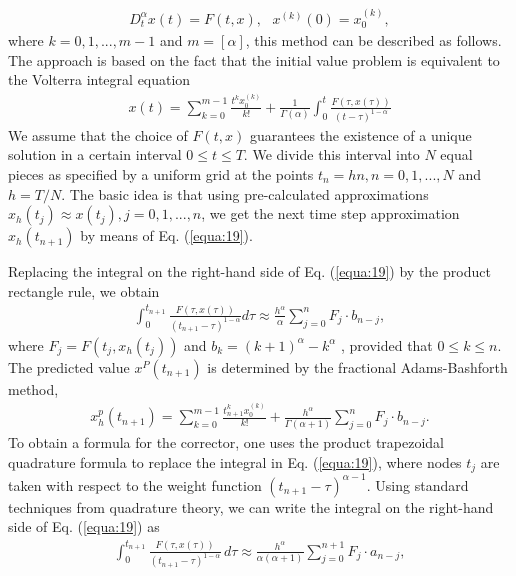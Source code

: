 \documentclass[10pt]{article}
\begin{document}
\begin{multicols}{2}
\begin{align}
            D_t^\alpha x(t) = F(t,x), ~~~ x^{(k)}(0) = x_0^{(k)}, \label{equa:18}
        \end{align}
        where $k = 0, 1, . . . , m - 1$ and $m = [\alpha]$, this method can be described as follows. The approach is based on the fact that the initial value problem is equivalent to the Volterra integral equation
        \begin{align}
            x(t) = \sum_{k=0}^{m-1} \frac{t^k x_0^{(k)}}{k!} + \frac{1}{\Gamma (\alpha)} \int_0^t \frac{F(\tau , x(\tau))}{(t- \tau)^{1-\alpha}} \label{equa:19}
        \end{align}
        We assume that the choice of $F(t, x)$ guarantees the existence of a unique solution in a certain interval $0 \le t \le T$. We divide this interval into $N$ equal pieces as specified by a uniform grid at the points $t_n = hn, n = 0, 1, . . . , N$ and $h = T / N$. The basic idea is that using pre-calculated approximations $x_h(t_j ) \approx x(t_j ), j = 0, 1, . . . , n$, we get the next time step approximation $x_h(t_{n+1})$ by means of Eq. (\ref{equa:19}). \par
        Replacing the integral on the right-hand side of Eq. (\ref{equa:19}) by the product rectangle rule, we obtain
        \begin{align}
            \int_0^{t_{n+1}} \frac{F(\tau , x(\tau))}{(t_{n+1}-\tau)^{1-\alpha}}d\tau \approx \frac{h^\alpha}{\alpha} \sum_{j=0}^n F_j \cdot b_{n-j}, \label{equa:20}
        \end{align}
        where $F_j = F(t_j , x_h(t_j))$ and $b_k = (k + 1)^\alpha - k^\alpha$ , provided that $0 \le k \le n$. The predicted value $x^P (t_{n+1})$ is determined by the fractional Adams-Bashforth method,
        \begin{align}
            x_h^p (t_{n+1}) = \sum_{k=0}^{m-1} \frac{t_{n+1}^k x_0^{(k)}}{k!} + \frac{h^\alpha}{\Gamma (\alpha + 1)} \sum_{j=0}^n F_j \cdot b_{n-j}. \label{equa:21}
        \end{align}
        To obtain a formula for the corrector, one uses the product trapezoidal quadrature formula to replace the integral in Eq. (\ref{equa:19}), where nodes $t_j$ are taken with respect to the weight function $(t_{n+1} - \tau)^{\alpha - 1}$. Using standard techniques from quadrature theory, we can write the integral on the right-hand side of Eq. (\ref{equa:19}) as
        \begin{align}
            \int_0^{t_{n+1}} \frac{F(\tau,x(\tau))}{(t_{n+1}-\tau)^{1-\alpha}}\,d\tau \approx \frac{h^\alpha}{\alpha(\alpha + 1)} \sum_{j=0}^{n+1} F_j \cdot a_{n-j}, \label{equa:22}

\end{align}
\end{multicols}
\end{document}
